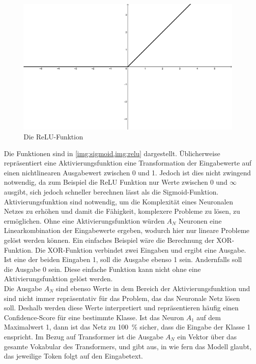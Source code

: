 \begin{figure}
    \centering
    \includegraphics[width=\textwidth]{zeichnungen/relu.png}
    \caption{Die ReLU-Funktion}\label{img:relu}
\end{figure}

Die Funktionen sind in \cref{img:sigmoid,img:relu} dargestellt.
Üblicherweise repräsentiert eine Aktivierungsfunktion eine Transformation der Eingabewerte auf einen nichtlinearen Ausgabewert zwischen 0 und 1.
Jedoch ist dies nicht zwingend notwendig, da zum Beispiel die ReLU Funktion nur Werte zwischen 0 und $\infty$ ausgibt, sich jedoch schneller berechnen lässt als die Sigmoid-Funktion.
Aktivierungsfunktion sind notwendig, um die Komplexität eines Neuronalen Netzes zu erhöhen und damit die Fähigkeit, komplexere Probleme zu lösen, zu ermöglichen.
Ohne eine Aktivierungsfunktion würden $A_N$ Neuronen eine Linearkombination der Eingabewerte ergeben, wodurch hier nur lineare Probleme gelöst werden können.
Ein einfaches Beispiel wäre die Berechnung der XOR-Funktion.
Die XOR-Funktion verbindet zwei Eingaben und ergibt eine Ausgabe. Ist eine der beiden Eingaben 1, soll die Ausgabe ebenso 1 sein.
Andernfalls soll die Ausgabe 0 sein.
Diese einfache Funktion kann nicht ohne eine Aktivierungsfunktion gelöst werden.\\

Die Ausgabe $A_N$ sind ebenso Werte in dem Bereich der Aktivierungsfunktion und sind nicht immer repräsentativ für das Problem, das das Neuronale Netz lösen soll.
Deshalb werden diese Werte interpretiert und repräsentieren häufig einen Confidence-Score für eine bestimmte Klasse.
Ist das Neuron $A_1$ auf dem Maximalwert 1, dann ist das Netz zu \SI{100}{\percent} sicher, dass die Eingabe der Klasse 1 enspricht.
Im Bezug auf Transformer ist die Ausgabe $A_N$ ein Vektor über das gesamte Vokabular des Transformers, und gibt aus, in wie fern das Modell glaubt, das jeweilige Token folgt auf den Eingabetext.\\

